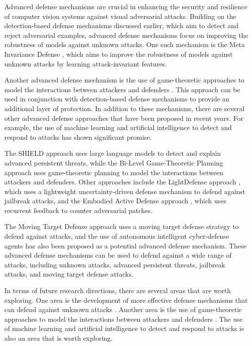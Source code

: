 \documentclass[11pt]{article}
\begin{document}
Advanced defense mechanisms are crucial in enhancing the security and resilience of computer vision systems against visual adversarial attacks. Building on the detection-based defense mechanisms discussed earlier, which aim to detect and reject adversarial examples, advanced defense mechanisms focus on improving the robustness of models against unknown attacks. One such mechanism is the Meta Invariance Defense \cite{ref100}, which aims to improve the robustness of models against unknown attacks by learning attack-invariant features.

Another advanced defense mechanism is the use of game-theoretic approaches to model the interactions between attackers and defenders \cite{ref101}. This approach can be used in conjunction with detection-based defense mechanisms to provide an additional layer of protection. In addition to these mechanisms, there are several other advanced defense approaches that have been proposed in recent years. For example, the use of machine learning and artificial intelligence to detect and respond to attacks \cite{ref102} has shown significant promise.

The SHIELD approach \cite{ref103} uses large language models to detect and explain advanced persistent threats, while the Bi-Level Game-Theoretic Planning approach \cite{ref104} uses game-theoretic planning to model the interactions between attackers and defenders. Other approaches include the LightDefense approach \cite{ref105}, which uses a lightweight uncertainty-driven defense mechanism to defend against jailbreak attacks, and the Embodied Active Defense approach \cite{ref106}, which uses recurrent feedback to counter adversarial patches.

The Moving Target Defense approach \cite{ref107} uses a moving target defense strategy to defend against attacks, and the use of autonomous intelligent cyber-defense agents \cite{ref108} has also been proposed as a potential advanced defense mechanism. These advanced defense mechanisms can be used to defend against a wide range of attacks, including unknown attacks, advanced persistent threats, jailbreak attacks, and moving target defense attacks.

In terms of future research directions, there are several areas that are worth exploring. One area is the development of more effective defense mechanisms that can defend against unknown attacks \cite{ref100}. Another area is the use of game-theoretic approaches to model the interactions between attackers and defenders \cite{ref101}. The use of machine learning and artificial intelligence to detect and respond to attacks \cite{ref102} is also an area that is worth exploring.
\end{document}
